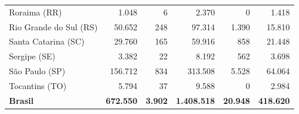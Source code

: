 \documentclass[11pt,a4paper]{article}
\begin{document}
\begin{table}[htbp]
\begin{tabular}{l r r r r r}
Roraima (RR) & 1.048 & 6 & 2.370 & 0 & 1.418 \\
Rio Grande do Sul (RS) & 50.652 & 248 & 97.314 & 1.390 & 15.810 \\
Santa Catarina (SC) & 29.760 & 165 & 59.916 & 858 & 21.448 \\
Sergipe (SE) & 3.382 & 22 & 8.192 & 562 & 3.698 \\
São Paulo (SP) & 156.712 & 834 & 313.508 & 5.528 & 64.064 \\
Tocantins (TO) & 5.794 & 37 & 9.588 & 0 & 2.984 \\
\midrule
\textbf{Brasil} & \textbf{672.550} & \textbf{3.902} & \textbf{1.408.518} & \textbf{20.948} & \textbf{418.620} \\
\bottomrule
\end{tabular}
\par\vspace{3pt}{\footnotesize\raggedright ``reg.'' = registros brutos
bronze (append-only, 2013\textendash 2025); ``estab.'' = CNES distintos
com ao menos um registro de RM no período. O total nacional bruto das
quatro modalidades é 2.520.636 registros em 17.846 estabelecimentos
distintos.\par}
\end{table}
\end{document}
